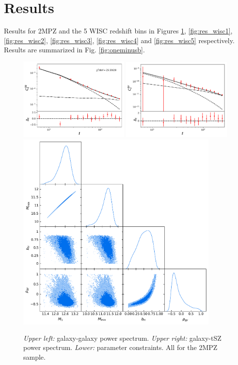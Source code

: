 \documentclass{article}
\begin{document}
\section{Results}
  Results for 2MPZ and the 5 WISC redshift bins in Figures \ref{fig:res_2mpz}, \ref{fig:res_wisc1}, \ref{fig:res_wisc2}, \ref{fig:res_wisc3}, \ref{fig:res_wisc4} and \ref{fig:res_wisc5} respectively. Results are summarized in Fig. \ref{fig:oneminusb}.
  \begin{figure}
    \centering
    \includegraphics[width = 0.49\textwidth]{../output_test/sampler_minimal_hmc_2mpz_cls_2mpz_2mpz}
    \includegraphics[width = 0.49\textwidth]{../output_test/sampler_minimal_hmc_2mpz_cls_2mpz_y_milca}
    \includegraphics[width = 0.90\textwidth]{../output_test/sampler_minimal_hmc_2mpz_triangle}
    \caption{{\sl Upper left:} galaxy-galaxy power spectrum. {\sl Upper right:} galaxy-tSZ power spectrum. {\sl Lower:} parameter constraints. All for the 2MPZ sample.}\label{fig:res_2mpz}
  \end{figure}
\end{document}
